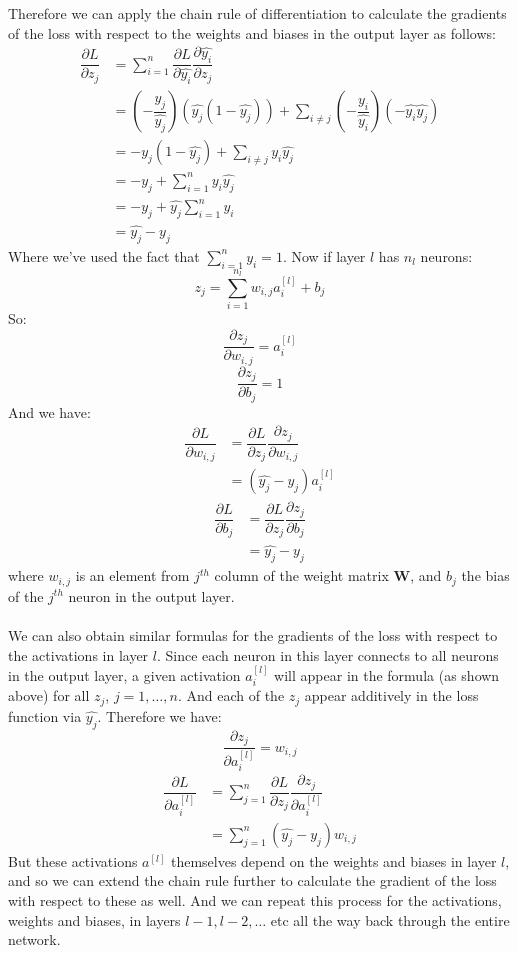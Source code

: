 \documentclass[11pt]{article} %
\theoremstyle{plain}
\theoremstyle{definition}
\begin{document}
Therefore we can apply the chain rule of differentiation to calculate the gradients of the loss with respect to the weights and biases in the output layer as follows:
\begin{align*}
\dfrac{\partial L}{\partial z_j} &= \sum_{i=1}^n \dfrac{\partial L}{\partial \hat{y_i}} \dfrac{\partial \hat{y_i}}{\partial z_j} \\
&= (-\dfrac {y_j}{\hat{y_j}}) (\hat{y_j}(1-\hat{y_j})) + \sum_{i \neq j} (-\dfrac {y_i}{\hat{y_i}})(-\hat{y_i}\hat{y_j}) \\
&= -y_j(1-\hat{y_j}) + \sum_{i \neq j} y_i\hat{y_j} \\
&= -y_j + \sum_{i = 1}^n y_i\hat{y_j}  \\
&= -y_j + \hat{y_j}\sum_{i = 1}^n y_i \\ 
&= \hat{y_j} - y_j 
\end{align*}
Where we've used the fact that \(\sum_{i=1}^n y_i =1 \). Now if layer \(l\) has \(n_l\) neurons:
\[ z_j = \sum_{i=1}^{n_l} w_{i,j}a^{[l]}_i + b_j\]
So:
\[ \dfrac{\partial z_j}{\partial w_{i,j}} = a^{[l]}_i \]
\[ \dfrac{\partial z_j}{\partial b_j} = 1 \]
And we have:
\begin{align*}
\dfrac{\partial L}{\partial w_{i,j}} &= \dfrac{\partial L}{\partial z_j}\dfrac{\partial z_j}{\partial w_{i,j}} \\
&= (\hat{y_j}-y_j)a^{[l]}_i
\end{align*}
\begin{align*}
\dfrac{\partial L}{\partial b_j} &= \dfrac{\partial L}{\partial z_j}\dfrac{\partial z_j}{\partial b_j} \\
&= \hat{y_j}-y_j
\end{align*}
where \(w_{i,j}\) is an element from \(j^{th}\) column of the weight matrix \(\mathbf{W}\), and \(b_j\) the bias of the \(j^{th}\) neuron in the output layer. 
\\
\\
\noindent
We can also obtain similar formulas for the gradients of the loss with respect to the activations in layer \(l\). Since each neuron in this layer connects to all neurons in the output layer, a given activation \(a^{[l]}_i\) will appear in the formula (as shown above) for all \(z_j\), \(j=1,\ldots,n\). And each of the \(z_j\) appear additively in the loss function via $\hat{y_j}$. Therefore we have:
\[ \dfrac{\partial z_j}{\partial a^{[l]}_i} = w_{i,j}\]
\begin{align*}
\dfrac{\partial L}{\partial a^{[l]}_i} &= \sum_{j=1}^{n} \dfrac{\partial L}{\partial z_j}\dfrac{\partial z_j}{\partial a^{[l]}_i} \\
&= \sum_{j=1}^{n} (\hat{y_j}-y_j)w_{i,j}
\end{align*}
But these activations \(a^{[l]}\) themselves depend on the weights and biases in layer \(l\), and so we can extend the chain rule further to calculate the gradient of the loss with respect to these as well. And we can repeat this process for the activations, weights and biases, in layers \({l-1}, {l-2}, \ldots \) etc all the way back through the entire network.
\end{document}
